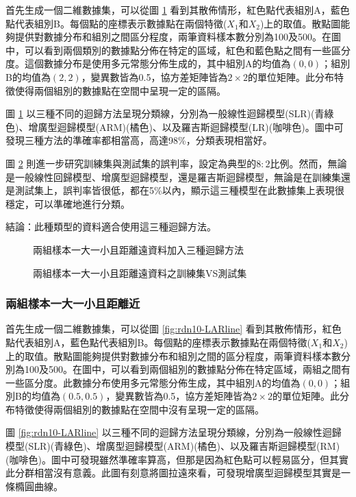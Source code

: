 \documentclass[12pt, a4paper]{article}
\begin{document}
首先生成一個二維數據集，可以從圖 \ref{fig:rdn9-LARline} 看到其散佈情形，紅色點代表組別A，藍色點代表組別B。每個點的座標表示數據點在兩個特徵($X_1$和$X_2$)上的取值。散點圖能夠提供對數據分布和組別之間區分程度，兩筆資料樣本數分別為100及500。在圖中，可以看到兩個類別的數據點分佈在特定的區域，紅色和藍色點之間有一些區分度。這個數據分布是使用多元常態分佈生成的，其中組別A的均值為$(0, 0)$；組別B的均值為$(2, 2)$，變異數皆為0.5，協方差矩陣皆為$2 \times 2$的單位矩陣。此分布特徵使得兩個組別的數據點在空間中呈現一定的區隔。

圖 \ref{fig:rdn9-LARline} 以三種不同的迴歸方法呈現分類線，分別為一般線性迴歸模型(SLR)(青綠色)、增廣型迴歸模型(ARM)(橘色)、以及羅吉斯迴歸模型(LR)(咖啡色)。圖中可發現三種方法的準確率都相當高，高達98\%，分類表現相當好。

圖 \ref{fig:rdn9-LARline2} 則進一步研究訓練集與測試集的誤判率，設定為典型的$8:2$比例。然而，無論是一般線性回歸模型、增廣型迴歸模型，還是羅吉斯迴歸模型，無論是在訓練集還是測試集上，誤判率皆很低，都在5\%以內，顯示這三種模型在此數據集上表現很穩定，可以準確地進行分類。

結論：此種類型的資料適合使用這三種迴歸方法。
\begin{figure}[H]
    \caption{兩組樣本一大一小且距離遠資料加入三種迴歸方法}
    \label{fig:rdn9-LARline}
\end{figure}
\begin{figure}[H]
    \caption{兩組樣本一大一小且距離遠資料之訓練集VS測試集}
    \label{fig:rdn9-LARline2}
\end{figure}


\subsubsection{兩組樣本一大一小且距離近}

首先生成一個二維數據集，可以從圖 \ref{fig:rdn10-LARline} 看到其散佈情形，紅色點代表組別A，藍色點代表組別B。每個點的座標表示數據點在兩個特徵($X_1$和$X_2$)上的取值。散點圖能夠提供對數據分布和組別之間的區分程度，兩筆資料樣本數分別為100及500。在圖中，可以看到兩個組別的數據點分佈在特定區域，兩組之間有一些區分度。此數據分布使用多元常態分佈生成，其中組別A的均值為$(0, 0)$；組別B的均值為$(0.5, 0.5)$，變異數皆為0.5，協方差矩陣皆為$2 \times 2$的單位矩陣。此分布特徵使得兩個組別的數據點在空間中沒有呈現一定的區隔。

圖 \ref{fig:rdn10-LARline} 以三種不同的迴歸方法呈現分類線，分別為一般線性迴歸模型(SLR)(青綠色)、增廣型迴歸模型(ARM)(橘色)、以及羅吉斯迴歸模型(RM)(咖啡色)。圖中可發現雖然準確率算高，但那是因為紅色點可以輕易區分，但其實此分群相當沒有意義。此圖有刻意將圖拉遠來看，可發現增廣型迴歸模型其實是一條橢圓曲線。
\end{document}
